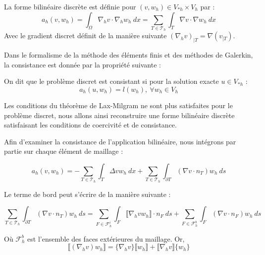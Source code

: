 La forme bilinéaire discrète est définie pour $(v,w_h)\in V_{*h}\times V_h$ par :
$$a_h(v,w_h) = \int_{\Omega} \nabla_h v \cdot \nabla_h w_h \ dx = \sum_{T \in \mathcal{T}_h}\int_T \nabla v \cdot \nabla w_h \ dx $$
Avec le gradient discret définit de la manière suivante $(\nabla_h v)_{|T} = \nabla (v_{|T})$.

Dans le formalisme de la méthode des éléments finis et des méthodes de Galerkin, la consistance est donnée par la propriété suivante :

\begin{definitionbox}
\begin{definition}
    On dit que le problème discret est consistant si pour la solution exacte $u \in V_{*h}$ :
    $$ a_h(u,w_h) = l(w_h), \ \forall w_h \in V_h $$
\end{definition}
\end{definitionbox}
Les conditions du théorème de Lax-Milgram ne sont plus satisfaites pour le problème discret, nous allons ainsi reconstruire une forme bilinéaire discrète satisfaisant les conditions de coercivité et de consistance.

Afin d'examiner la consistance de l'application bilinéaire, nous intégrons par partie sur chaque élément de maillage :

$$a_h(v,w_h) = - \sum_{T \in \mathcal{T}_h} \int_{T} \Delta v w_h \ dx + \sum_{T \in \mathcal{T}_h} \int_{\partial T } (\nabla v \cdot n_T) w_h \ ds $$

Le terme de bord peut s'écrire de la manière suivante :

$$\sum_{T \in \mathcal{T}_h} \int_{\partial T} (\nabla v \cdot n_T)w_h \ ds = \sum_{F \in \mathcal{F}_h^i} \int_F \llbracket \nabla_h v w_h \rrbracket \cdot n_F \ ds + \sum_{F \in \mathcal{F}_h^b}\int_F (\nabla v \cdot n_F)w_h \ ds$$

Où $\mathcal{F}_h^b$ est l'ensemble des faces extérieures du maillage.
Or,
$$\llbracket (\nabla_h v)w_h \rrbracket = \{ \nabla_hv \} \llbracket w_h \rrbracket + \llbracket \nabla_h v \rrbracket \{w_h\} $$

